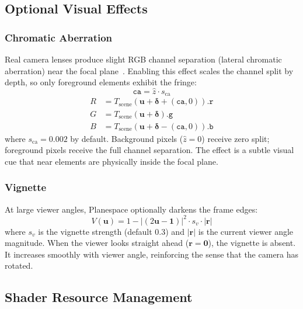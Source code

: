 \documentclass[10pt,twocolumn]{article}
\newcommand{\normz}{\hat{z}}
\newcommand{\UV}{\mathbf{u}}
\newcommand{\offset}{\boldsymbol{\delta}}
\newcommand{\Tscene}{T_{\mathrm{scene}}}
\begin{document}
\subsection{Optional Visual Effects}

\subsubsection{Chromatic Aberration}

Real camera lenses produce slight RGB channel separation (lateral chromatic
aberration) near the focal plane~\cite{kingslake1978}. Enabling this effect
scales the channel split by depth, so only foreground elements exhibit the
fringe:
\begin{equation}
  \mathtt{ca} = \normz \cdot s_{\mathrm{ca}}
\end{equation}
\begin{align}
  R &= \Tscene(\UV + \offset + (\mathtt{ca}, 0)).\texttt{r}  \\
  G &= \Tscene(\UV + \offset).\texttt{g}                     \\
  B &= \Tscene(\UV + \offset - (\mathtt{ca}, 0)).\texttt{b}
  \label{eq:ca}
\end{align}
where $s_{\mathrm{ca}} = 0.002$ by default. Background pixels ($\normz = 0$)
receive zero split; foreground pixels receive the full channel separation.
The effect is a subtle visual cue that near elements are physically inside
the focal plane.

\subsubsection{Vignette}

At large viewer angles, Planespace optionally darkens the frame edges:
\begin{equation}
  V(\UV) = 1 - \bigl|(2\UV - \mathbf{1})\bigr|^2 \cdot s_v \cdot |\mathbf{r}|
  \label{eq:vignette}
\end{equation}
where $s_v$ is the vignette strength (default 0.3) and $|\mathbf{r}|$ is the
current viewer angle magnitude. When the viewer looks straight ahead
($\mathbf{r} = \mathbf{0}$), the vignette is absent. It increases smoothly
with viewer angle, reinforcing the sense that the camera has rotated.

\subsection{Shader Resource Management}
\end{document}
